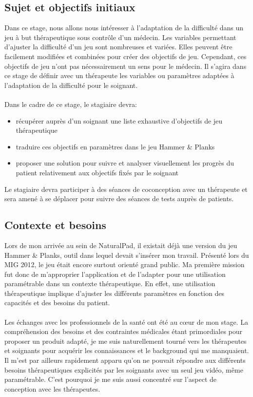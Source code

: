 \subsection{Sujet et objectifs initiaux}
	Dans ce stage, nous allons nous intéresser à l’adaptation de la difficulté dans un jeu à but thérapeutique sous contrôle d’un médecin. Les variables permettant d’ajuster la difficulté d’un jeu sont nombreuses et variées. Elles peuvent être facilement modifiées et combinées pour créer des objectifs de jeu. Cependant, ces objectifs de jeu n’ont pas nécessairement un sens pour le médecin. Il s’agira dans ce stage de définir avec un thérapeute les variables ou paramètres adaptées à l’adaptation de la difficulté pour le soignant.
	\paragraph{}
	Dans le cadre de ce stage, le stagiaire devra:
	\begin{itemize}
		\item {récupérer auprès d’un soignant une liste exhaustive d’objectifs de jeu thérapeutique}
		\item {traduire ces objectifs en paramètres dans le jeu Hammer \& Planks}
		\item {proposer une solution pour suivre et analyser visuellement les progrès du patient relativement aux objectifs fixés par le soignant}
	\end{itemize}
	Le stagiaire devra participer à des séances de coconception avec un thérapeute et sera amené à se déplacer pour suivre des séances de tests auprès de patients.
		
\subsection{Contexte et besoins}
Lors de mon arrivée au sein de NaturalPad, il existait déjà une version du jeu Hammer \& Planks, outil dans lequel devait s'insérer mon travail. Présenté lors du MIG 2012, le jeu était encore surtout orienté grand public. Ma première mission fut donc de m'approprier l'application et de l'adapter pour une utilisation paramétrable dans un contexte thérapeutique. En effet, une utilisation thérapeutique implique d'ajuster les différents paramètres en fonction des capacités et des besoins du patient.

	\paragraph{}Les échanges avec les professionnels de la santé ont été au cœur de mon stage. La compréhension des besoins et des contraintes médicales étant primordiales pour proposer un produit adapté, je me suis naturellement tourné vers les thérapeutes et soignants pour acquérir les connaissances et le background qui me manquaient. Il m'est par ailleurs rapidement apparu qu'on ne pouvait répondre aux différents besoins thérapeutiques explicités par les soignants avec un seul jeu vidéo, même paramétrable. C'est pourquoi je me suis aussi concentré sur l'aspect de conception avec les thérapeutes. 

